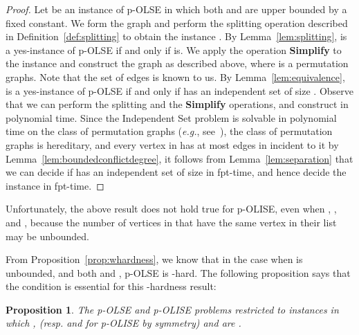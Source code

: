 \documentclass[11pt]{article}
\newtheorem{proposition}[theorem]{Proposition}
\def\eg{{\em e.g.}}
\begin{document}
\begin{proof}
Let  be an instance of p-OLSE in which both  and  are upper bounded by a fixed constant. We form the graph  and perform the splitting operation described in Definition~\ref{def:splitting} to obtain the instance . By Lemma~\ref{lem:splitting},  is a yes-instance of p-OLSE if and only if  is. We apply the operation {\bf Simplify} to the instance and construct the graph  as described above, where  is a permutation graphs. Note that the set of edges  is known to us. By Lemma~\ref{lem:equivalence},  is a yes-instance of p-OLSE if and only if  has an independent set of size . Observe that we can perform the splitting and the {\bf Simplify} operations, and construct  in polynomial time. Since the {\sc Independent Set} problem is solvable in polynomial time on the class of permutation graphs (\eg, see~\cite{kim}), the class of permutation graphs is hereditary, and every vertex in  has at most  edges in  incident to it by Lemma~\ref{lem:boundedconflictdegree}, it follows from Lemma~\ref{lem:separation} that we can decide if  has an independent set of size  in fpt-time, and hence decide the instance  in fpt-time. \end{proof}

Unfortunately, the above result does not hold true for p-OLISE, even when , , and , because the number of vertices in  that have the same vertex  in their list may be unbounded.

From Proposition~\ref{prop:whardness}, we know that in the case when  is unbounded, and both  and , p-OLSE is -hard. The following proposition says that the condition  is essential for this -hardness result:

\begin{proposition}
\label{prop:randomsimple}
The p-OLSE and p-OLISE problems restricted to instances in which ,  (resp.  and  for p-OLISE by symmetry) and  are .
\end{proposition}
\end{document}
